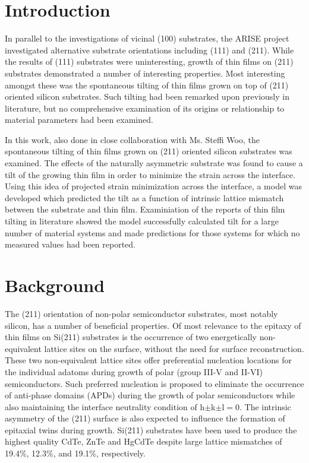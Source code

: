 \section{Introduction}
In parallel to the investigations of vicinal (100) substrates, the ARISE project investigated alternative substrate orientations including (111) and (211). While the results of (111) substrates were uninteresting, growth of thin films on (211) substrates demonstrated a number of interesting properties. Most interesting amongst these was the spontaneous tilting of thin films grown on top of (211) oriented silicon substrates. Such tilting had been remarked upon previously in literature,  but no comprehensive examination of its origins or relationship to material parameters had been examined.

In this work, also done in close collaboration with Ms. Steffi Woo, the spontaneous tilting of thin films grown on (211) oriented silicon substrates was examined. The effects of the naturally asymmetric substrate was found to cause a tilt of the growing thin film in order to minimize the strain across the interface. Using this idea of projected strain minimization across the interface, a model was developed which predicted the tilt as a function of intrinsic lattice mismatch between the substrate and thin film. Examiniation of the reports of thin film tilting in literature showed the model successfully calculated tilt for a large number of material systems and made predictions for those systems for which no measured values had been reported.
\section{Background}
The (211) orientation of non-polar semiconductor substrates, most notably silicon, has a number of beneficial properties. Of most relevance to the epitaxy of thin films on Si(211) substrates is the occurrence of two energetically non-equivalent lattice sites on the surface, without the need for surface reconstruction.\cite{Wright1982} These two non-equivalent lattice sites offer preferential nucleation locations for the individual adatoms during growth of polar (group III-V and II-VI) semiconductors. Such preferred nucleation is proposed to eliminate the occurrence of anti-phase domains (APDs) during the growth of polar semiconductors\cite{Wright1982} while also maintaining the interface neutrality condition of h$\pm$k$\pm$l$=$0.\cite{Wright1982} The intrinsic asymmetry of the (211) surface is also expected to influence the formation of epitaxial twins during growth\cite{Devenyi2011}. Si(211) substrates have been used to produce the highest quality CdTe\cite{Zhao2011}, ZnTe\cite{Wang2011a} and HgCdTe\cite{Dhar1997a} despite large lattice mismatches of 19.4\%, 12.3\%, and 19.1\%, respectively. 

